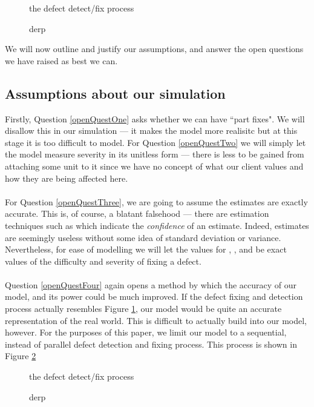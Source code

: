\begin{figure}
	\FIXME the defect detect/fix process
	\caption{derp} \label{realDefectProcess}
\end{figure}

We will now outline and justify our assumptions, and answer the open questions we have raised as
best we can.

\subsection{Assumptions about our simulation}

Firstly, Question \ref{openQuestOne} asks whether we can have ``part fixes".
We will disallow this in our simulation --- it makes the model more realisitc but at this stage it
is too difficult to model.
For Question \ref{openQuestTwo} we will simply let the model measure severity in its
unitless form --- there is less to be gained from attaching some unit to it since we have no concept
of what our client values and how they are being affected here.\\
\\
For Question \ref{openQuestThree}, we are going to assume the estimates are exactly accurate.
This is, of course, a blatant falsehood --- there are estimation techniques such as \FIXME which
indicate the {\em confidence} of an estimate.
Indeed, estimates are seemingly useless without some idea of standard deviation or variance.
Nevertheless, for ease of modelling we will let the values for \easy, \hard, \minor and \major be
exact values of the difficulty and severity of fixing a defect.\\
\\
Question \ref{openQuestFour} again opens a method by which the accuracy of our model, and its power
could be much improved.
If the defect fixing and detection process actually resembles Figure \ref{realDefectProcess}, our
model would be quite an accurate representation of the real world.
This is difficult to actually build into our model, however.
For the purposes of this paper, we limit our model to a sequential, instead of parallel defect
detection and fixing process.
This process is shown in Figure \ref{fakeDefectProcess}

\begin{figure}[ht!]
	\FIXME the defect detect/fix process
	\caption{derp} \label{fakeDefectProcess}
\end{figure}

